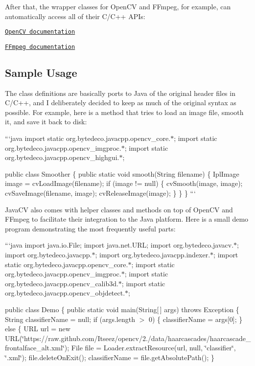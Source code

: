After that, the wrapper classes for Open\+C\+V and F\+Fmpeg, for example, can automatically access all of their C/\+C++ A\+P\+Is\+:


\begin{DoxyItemize}
\item \href{http://docs.opencv.org/}{\tt Open\+C\+V documentation}
\item \href{http://ffmpeg.org/doxygen/}{\tt F\+Fmpeg documentation}
\end{DoxyItemize}

\subsection*{Sample Usage }

The class definitions are basically ports to Java of the original header files in C/\+C++, and I deliberately decided to keep as much of the original syntax as possible. For example, here is a method that tries to load an image file, smooth it, and save it back to disk\+:

```java import static org.\+bytedeco.\+javacpp.\+opencv\+\_\+core.$\ast$; import static org.\+bytedeco.\+javacpp.\+opencv\+\_\+imgproc.$\ast$; import static org.\+bytedeco.\+javacpp.\+opencv\+\_\+highgui.$\ast$;

public class Smoother \{ public static void smooth(\+String filename) \{ Ipl\+Image image = cv\+Load\+Image(filename); if (image != null) \{ cv\+Smooth(image, image); cv\+Save\+Image(filename, image); cv\+Release\+Image(image); \} \} \} ```

Java\+C\+V also comes with helper classes and methods on top of Open\+C\+V and F\+Fmpeg to facilitate their integration to the Java platform. Here is a small demo program demonstrating the most frequently useful parts\+:

```java import java.\+io.\+File; import java.\+net.\+U\+R\+L; import org.\+bytedeco.\+javacv.$\ast$; import org.\+bytedeco.\+javacpp.$\ast$; import org.\+bytedeco.\+javacpp.\+indexer.$\ast$; import static org.\+bytedeco.\+javacpp.\+opencv\+\_\+core.$\ast$; import static org.\+bytedeco.\+javacpp.\+opencv\+\_\+imgproc.$\ast$; import static org.\+bytedeco.\+javacpp.\+opencv\+\_\+calib3d.$\ast$; import static org.\+bytedeco.\+javacpp.\+opencv\+\_\+objdetect.$\ast$;

public class Demo \{ public static void main(\+String\mbox{[}$\,$\mbox{]} args) throws Exception \{ String classifier\+Name = null; if (args.\+length $>$ 0) \{ classifier\+Name = args\mbox{[}0\mbox{]}; \} else \{ U\+R\+L url = new U\+R\+L(\char`\"{}https\+://raw.\+github.\+com/\+Itseez/opencv/2./data/haarcascades/haarcascade\+\_\+frontalface\+\_\+alt.\+xml\char`\"{}); File file = Loader.\+extract\+Resource(url, null, \char`\"{}classifier\char`\"{}, \char`\"{}.\+xml\char`\"{}); file.\+delete\+On\+Exit(); classifier\+Name = file.\+get\+Absolute\+Path(); \}

